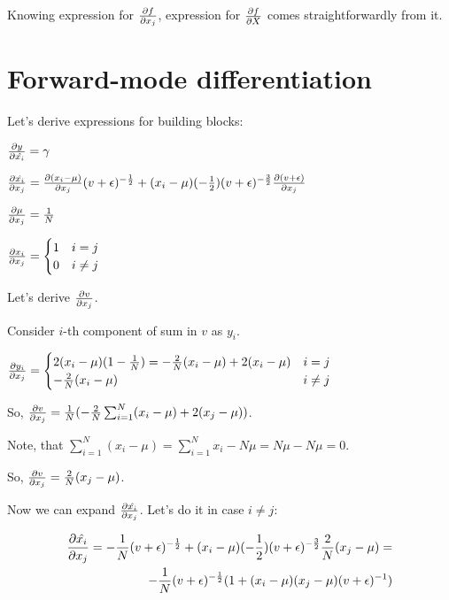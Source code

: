\documentclass[12pt]{article}
\begin{document}
Knowing expression for $\pdv{f}{x_j}$, expression for $\pdv{f}{X}$ comes straightforwardly from it.



\section*{Forward-mode differentiation}  

Let's derive expressions for building blocks:

$\pdv{y}{\hat{x_i}} = \gamma$ 

$\pdv{\hat{x_i}}{x_j} = 
\pdv{(x_i - \mu)}{x_j} (v + \epsilon)^{-\frac{1}{2}} + (x_i - \mu) (-\frac{1}{2}) (v + \epsilon)^{-\frac{3}{2}} \pdv{(v + \epsilon)}{x_j}$

$\pdv{\mu}{x_j} = \frac{1}{N}$

$
\pdv{x_i}{x_j} = 
\begin{cases}
1 &\text{$i = j$}\\
0 &\text{$i \ne j$}
\end{cases}
$

Let's derive $\pdv{v}{x_j}$.

Consider $i$-th component of sum in $v$ as $y_i$.

$
\pdv{y_i}{x_j} = 
\begin{cases}
2 (x_i - \mu) (1 - \frac{1}{N}) = -\frac{2}{N} (x_i - \mu) + 2(x_i - \mu) & \text{$i = j$} \\
-\frac{2}{N} (x_i - \mu) & \text{$i \ne j$}
\end{cases}
$ 

So, $\pdv{v}{x_j} = \frac{1}{N} ( -\frac{2}{N} \sum_{i=1}^{N}(x_i - \mu) + 2(x_j - \mu))$.

Note, that $\sum_{i=1}^{N}(x_i - \mu) = \sum_{i=1}^{N} x_i - N \mu = N \mu - N \mu = 0$.

So, $\pdv{v}{x_j} = \frac{2}{N} (x_j - \mu)$.

Now we can expand $\pdv{\hat{x_i}}{x_j}$. Let's do it in case $i \ne j$:

\begin{gather*}
\begin{split}
\pdv{\hat{x_i}}{x_j} =
-\frac{1}{N} (v + \epsilon)^{-\frac{1}{2}} + (x_i - \mu) (-\frac{1}{2}) (v + \epsilon)^{-\frac{3}{2}} \frac{2}{N}(x_j - \mu) = \\
-\frac{1}{N} (v + \epsilon)^{-\frac{1}{2}} (1 + (x_i - \mu) (x_j - \mu) (v + \epsilon)^{-1})
\end{split}
\end{gather*}
\end{document}
